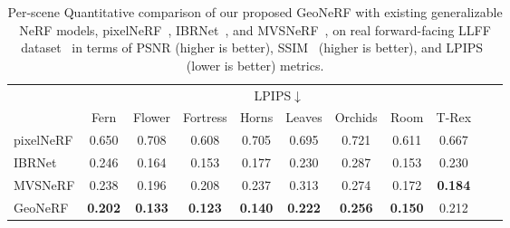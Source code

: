 \begin{table}[!t]
    \vspace{1.0ex}

    \begin{center}
        \begin{threeparttable}
            \begin{tabular}{l|cccccccccc}
            & \multicolumn{8}{c}{LPIPS$\downarrow$} \\
            &  Fern & Flower & Fortress & Horns & Leaves & Orchids & Room & T-Rex \\
            \hline
            pixelNeRF & 0.650 & 0.708 & 0.608 & 0.705 & 0.695 & 0.721 & 0.611 & 0.667 \\
            IBRNet & 0.246 & 0.164 & 0.153 & 0.177 & 0.230 & 0.287 & 0.153 & 0.230 \\
            MVSNeRF & 0.238 & 0.196 & 0.208 & 0.237 & 0.313 & 0.274 & 0.172 & \textbf{0.184} \\
            GeoNeRF & \textbf{0.202} & \textbf{0.133} & \textbf{0.123} & \textbf{0.140} & \textbf{0.222} & \textbf{0.256} & \textbf{0.150} & 0.212 \\
            \hline
            \end{tabular}
        \end{threeparttable}
    \end{center}
    \vspace{3ex}
    \caption{Per-scene Quantitative comparison of our proposed GeoNeRF with existing generalizable NeRF models, pixelNeRF~\citep{yu2021pixelnerf}, IBRNet~\citep{wang2021ibrnet}, and MVSNeRF~\citep{chen2021mvsnerf}, on real forward-facing LLFF dataset~\citep{mildenhall2019llff} in terms of PSNR (higher is better), SSIM~\citep{wang2004image} (higher is better), and LPIPS~\citep{zhang2018unreasonable} (lower is better) metrics.}
    \label{table:per_scene_no_ft_llff}
\end{table}

\clearpage

